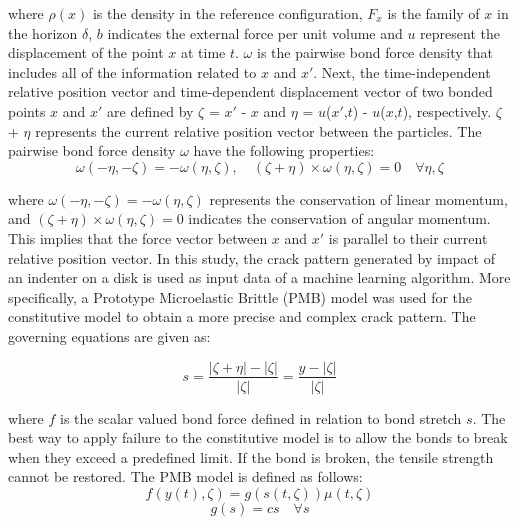 \noindent where $\rho(x)$ is the density in the reference configuration, $F_x$ is the family of $x$ in the horizon $\delta$, $b$ indicates the external force per unit volume and $u$ represent the displacement of the point $x$ at time $t$. $\omega$ is the pairwise bond force density that includes all of the information related to $x$ and ${x'}$.
Next, the time-independent relative position vector and time-dependent displacement vector of two bonded points $x$ and ${x'}$ are defined by $\zeta$ = ${x'}$ - $x$ and $\eta$ = $u$(${x'}$,$t$) - $u$($x$,$t$), respectively.
$\zeta$ + $\eta$ represents the current relative position vector between the particles. The pairwise bond force density $\omega$ have the following properties: 
\begin{equation}
\omega(-\eta,-\zeta)= -\omega(\eta, \zeta),\quad(\zeta + \eta)\times\omega(\eta, \zeta)=0 \quad\forall\eta,\zeta
\end{equation}




\noindent where $\omega(-\eta,-\zeta)= -\omega(\eta, \zeta)$ represents the conservation of linear momentum, and $(\zeta + \eta)\times\omega(\eta, \zeta)=0$ indicates the conservation of angular momentum. This implies that the force vector between $x$ and ${x'}$ is parallel to their current relative position vector. In this study, the crack pattern generated by impact of an indenter on a disk is used as input data of a machine learning algorithm. More specifically, a Prototype Microelastic Brittle (PMB) model \cite{Ref4} was used for the constitutive model to obtain a more precise and complex crack pattern. The governing equations are given as: 

\begin{equation}
s=\frac{|\zeta+\eta|-|\zeta|}{|\zeta|}=\frac{y-|\zeta|}{|\zeta|}
\end{equation}

\noindent where $f$ is the scalar valued bond force defined in relation to bond stretch $s$. The best way to apply failure to the constitutive model is to allow the bonds to break when they exceed a predefined limit. If the bond is broken, the tensile strength cannot be restored. The PMB model is defined as follows:
\begin{equation}
f(y(t),\zeta)=g(s(t,\zeta))\mu(t,\zeta)
\end{equation}
\begin{equation}
g(s)=cs \quad\forall s
\end{equation}

